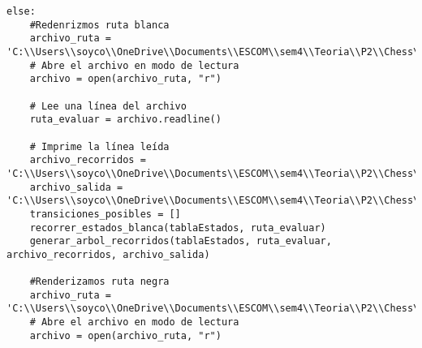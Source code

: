 \begin{lstlisting}
else:
    #Redenrizmos ruta blanca
    archivo_ruta = 'C:\\Users\\soyco\\OneDrive\\Documents\\ESCOM\\sem4\\Teoria\\P2\\Chess\\output\\ruta_blanca.txt'
    # Abre el archivo en modo de lectura
    archivo = open(archivo_ruta, "r")

    # Lee una línea del archivo
    ruta_evaluar = archivo.readline()

    # Imprime la línea leída
    archivo_recorridos = 'C:\\Users\\soyco\\OneDrive\\Documents\\ESCOM\\sem4\\Teoria\\P2\\Chess\\output\\recorridos_blanca.txt'
    archivo_salida = 'C:\\Users\\soyco\\OneDrive\\Documents\\ESCOM\\sem4\\Teoria\\P2\\Chess\\output\\arbol_blanca.dot'
    transiciones_posibles = []
    recorrer_estados_blanca(tablaEstados, ruta_evaluar)
    generar_arbol_recorridos(tablaEstados, ruta_evaluar, archivo_recorridos, archivo_salida)
    
    #Renderizamos ruta negra
    archivo_ruta = 'C:\\Users\\soyco\\OneDrive\\Documents\\ESCOM\\sem4\\Teoria\\P2\\Chess\\output\\ruta_negra.txt'
    # Abre el archivo en modo de lectura
    archivo = open(archivo_ruta, "r")


\end{lstlisting}
